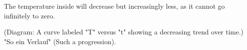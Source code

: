 The temperature inside will decrease but increasingly less, as it cannot go infinitely to zero.  

(Diagram: A curve labeled "T" versus "t" showing a decreasing trend over time.)  
"So ein Verlauf" (Such a progression).